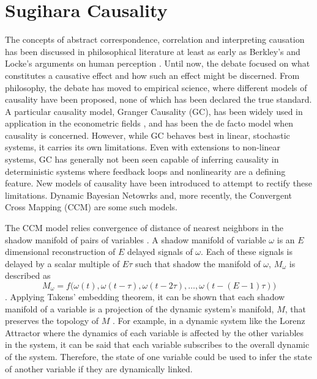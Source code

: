 \section{Sugihara Causality}
The concepts of abstract correspondence, correlation and interpreting causation has been discussed in philosophical literature at least as early as Berkley's and Locke's arguments on human perception \cite{Locke1841} \cite{Berkeley1874}. Until now, the debate focused on what constitutes a causative effect and how such an effect might be discerned. From philosophy, the debate has moved to empirical science, where different models of causality have been proposed, none of which has been declared the true standard. A particular causality model, Granger Causality (GC), has been widely used in application in the econometric fields \cite{Granger1969}, and has been the de facto model when causality is concerned. However, while GC behaves best in linear, stochastic systems, it carries its own limitations. Even with extensions to non-linear systems, GC has generally not been seen capable of inferring causality in deterministic systems where feedback loops and nonlinearity are a defining feature. New models of causality have been introduced to attempt to rectify these limitations. Dynamic Bayesian Netowrks and, more recently, the Convergent Cross Mapping (CCM) are some such models. 

The CCM model relies convergence of distance of nearest neighbors in the shadow manifold of pairs of variables \cite{Sugihara2012}. A shadow manifold of variable $\omega$ is an $E$ dimensional reconstruction of $E$ delayed signals of $\omega$. Each of these signals is delayed by a scalar multiple of $E\tau$ such that shadow the manifold of $\omega$, $M_{\omega}$ is described as 
$$M_{\omega} = f\Big(\omega(t), \omega(t-\tau), \omega(t-2\tau), \dots, \omega(t-(E-1)\tau)\Big)$$.
Applying Takens' embedding theorem, it can be shown that each shadow manifold of a variable is a projection of the dynamic system's manifold, $M$, that preserves the topology of $M$ \cite{Dixon1999,Deyle2011,Takens1981}. For example, in a dynamic system like the Lorenz Attractor where the dynamics of each variable is affected by the other variables in the system, it can be said that each variable subscribes to the overall dynamic of the system. Therefore, the state of one variable could be used to infer the state of another variable if they are dynamically linked. 

